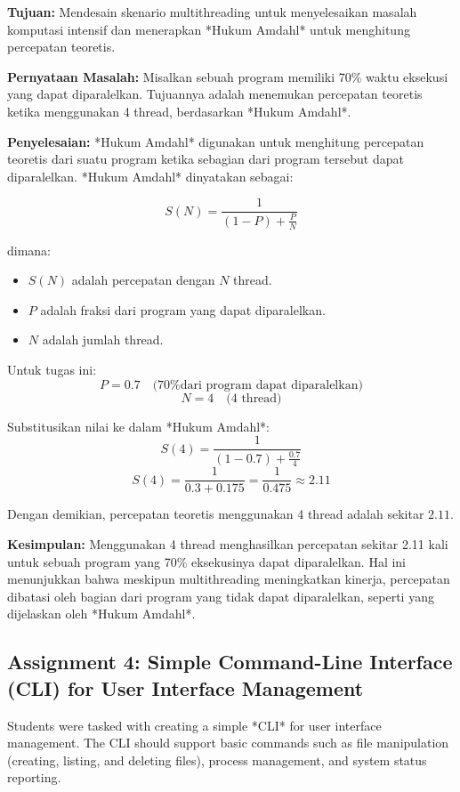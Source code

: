 \documentclass[12pt]{article}
\begin{document}
\textbf{Tujuan:}  
Mendesain skenario multithreading untuk menyelesaikan masalah komputasi intensif dan menerapkan *Hukum Amdahl* untuk menghitung percepatan teoretis.

\textbf{Pernyataan Masalah:}  
Misalkan sebuah program memiliki 70\% waktu eksekusi yang dapat diparalelkan. Tujuannya adalah menemukan percepatan teoretis ketika menggunakan 4 thread, berdasarkan *Hukum Amdahl*.

\textbf{Penyelesaian:}  
*Hukum Amdahl* digunakan untuk menghitung percepatan teoretis dari suatu program ketika sebagian dari program tersebut dapat diparalelkan. *Hukum Amdahl* dinyatakan sebagai:

\[
S(N) = \frac{1}{(1 - P) + \frac{P}{N}}
\]

dimana:
\begin{itemize}
    \item \( S(N) \) adalah percepatan dengan \( N \) thread.
    \item \( P \) adalah fraksi dari program yang dapat diparalelkan.
    \item \( N \) adalah jumlah thread.
\end{itemize}

Untuk tugas ini:
\[
P = 0.7 \quad \text{(70\% dari program dapat diparalelkan)}
\]
\[
N = 4 \quad \text{(4 thread)}
\]

Substitusikan nilai ke dalam *Hukum Amdahl*:
\[
S(4) = \frac{1}{(1 - 0.7) + \frac{0.7}{4}}
\]
\[
S(4) = \frac{1}{0.3 + 0.175} = \frac{1}{0.475} \approx 2.11
\]

Dengan demikian, percepatan teoretis menggunakan 4 thread adalah sekitar \( 2.11 \).

\textbf{Kesimpulan:}  
Menggunakan 4 thread menghasilkan percepatan sekitar 2.11 kali untuk sebuah program yang 70\% eksekusinya dapat diparalelkan. Hal ini menunjukkan bahwa meskipun multithreading meningkatkan kinerja, percepatan dibatasi oleh bagian dari program yang tidak dapat diparalelkan, seperti yang dijelaskan oleh *Hukum Amdahl*.


\subsection{Assignment 4: Simple Command-Line Interface (CLI) for User Interface Management}
Students were tasked with creating a simple *CLI* for user interface management. The CLI should support basic commands such as file manipulation (creating, listing, and deleting files), process management, and system status reporting.
\end{document}
